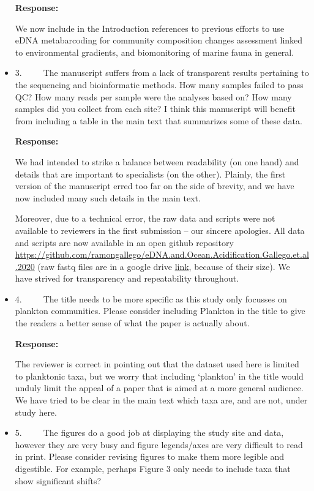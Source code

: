 \documentclass[11pt]{article}
\begin{document}
\begin{linenumbers}
\begin{itemize}
\textbf{Response:}

We now include in the Introduction references to previous efforts to use eDNA metabarcoding for community composition changes assessment linked to environmental gradients, and biomonitoring of marine fauna in general.

\item{3.      The manuscript suffers from a lack of transparent results pertaining to the sequencing and bioinformatic methods. How many samples failed to pass QC? How many reads per sample were the analyses based on? How many samples did you collect from each site? I think this manuscript will benefit from including a table in the main text that summarizes some of these data.}

\textbf{Response:}

We had intended to strike a balance between readability (on one hand) and details that are important to specialists (on the other). Plainly, the first version of the manuscript erred too far on the side of brevity, and we have now included many such details in the main text. 

Moreover, due to a technical error, the raw data and scripts were not available to reviewers in the first submission -- our sincere apologies. All data and scripts are now available in an open github repository \url{https://github.com/ramongallego/eDNA.and.Ocean.Acidification.Gallego.et.al.2020} (raw fastq files are in a google drive \href{https://drive.google.com/drive/folders/1XtuDMdlnk9V2acNiPJo5T6O1Tp0KjaCz?usp=sharing}{link}, because of their size). We have strived for transparency and repeatability throughout.

\item{4.      The title needs to be more specific as this study only focusses on plankton communities. Please consider including Plankton in the title to give the readers a better sense of what the paper is actually about.}

\textbf{Response:}

The reviewer is correct in pointing out that the dataset used here is limited to  planktonic taxa, but we worry that including `plankton' in the title would unduly limit the appeal of a paper that is aimed at a more general audience. We have tried to be clear in the main text which taxa are, and are not, under study here.


\item{5.      The figures do a good job at displaying the study site and data, however they are very busy and figure legends/axes are very difficult to read in print. Please consider revising figures to make them more legible and digestible. For example, perhaps Figure 3 only needs to include taxa that show significant shifts? }


\end{itemize}
\end{linenumbers}
\end{document}
